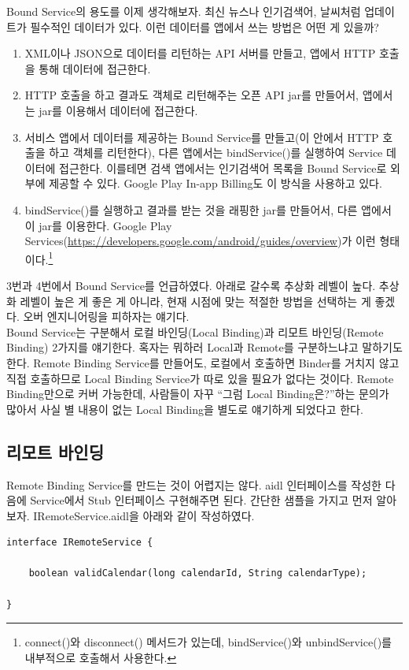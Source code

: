 Bound Service의 용도를 이제 생각해보자.
최신 뉴스나 인기검색어, 날씨처럼 업데이트가 필수적인 데이터가 있다. 이런 데이터를 앱에서 쓰는 방법은 어떤 게 있을까?
\begin{enumerate}
\item XML이나 JSON으로 데이터를 리턴하는 API 서버를 만들고, 앱에서 HTTP 호출을 통해 데이터에 접근한다.
\item HTTP 호출을 하고 결과도 객체로 리턴해주는 오픈 API jar를 만들어서, 앱에서는 jar를 이용해서 데이터에 접근한다.
\item 서비스 앱에서 데이터를 제공하는 Bound Service를 만들고(이 안에서 HTTP 호출을 하고 객체를 리턴한다), 다른 앱에서는 bindService()를 실행하여 Service 데이터에 접근한다. 이를테면 검색 앱에서는 인기검색어 목록을 Bound Service로 외부에 제공할 수 있다.
Google Play In-app Billing도 이 방식을 사용하고 있다.
\item bindService()를 실행하고 결과를 받는 것을 래핑한 jar를 만들어서, 다른 앱에서 이 jar를 이용한다. Google Play Services(\url{https://developers.google.com/android/guides/overview})가 이런 형태이다.\footnote{connect()와 disconnect() 메서드가 있는데, bindService()와 unbindService()를 내부적으로 호출해서 사용한다.}
\end{enumerate}
3번과 4번에서 Bound Service를 언급하였다. 
아래로 갈수록 추상화 레벨이 높다. 추상화 레벨이 높은 게 좋은 게 아니라, 현재 시점에 맞는 적절한 방법을 선택하는 게 좋겠다. 오버 엔지니어링을 피하자는 얘기다.\\

Bound Service는 구분해서 로컬 바인딩(Local Binding)과 리모트 바인딩(Remote Binding) 2가지를 얘기한다.
혹자는 뭐하러 Local과 Remote를 구분하느냐고 말하기도 한다.
Remote Binding Service를 만들어도, 로컬에서 호출하면 Binder를 거치지 않고 직접 호출하므로 Local Binding Service가 따로 있을 필요가 없다는 것이다. Remote Binding만으로 커버 가능한데, 사람들이 자꾸 ``그럼 Local Binding은?''하는 문의가 많아서 사실 별 내용이 없는 Local Binding을 별도로 얘기하게 되었다고 한다.\\

\subsection{리모트 바인딩}
Remote Binding Service를 만드는 것이 어렵지는 않다. aidl 인터페이스를 작성한 다음에 Service에서 Stub 인터페이스 구현해주면 된다.
간단한 샘플을 가지고 먼저 알아보자. 
IRemoteService.aidl을 아래와 같이 작성하였다. 
\begin{lstlisting}[frame=single]
interface IRemoteService {

	boolean validCalendar(long calendarId, String calendarType);
		
}
\end{lstlisting}


